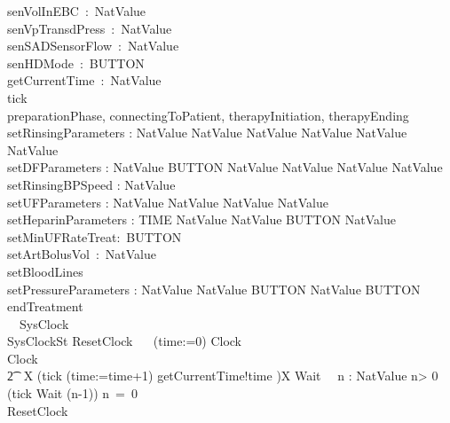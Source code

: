 \begin{circus}
  \circchannel senVolInEBC~:~NatValue\\
  \circchannel senVpTransdPress~:~NatValue\\
  \circchannel senSADSensorFlow~:~NatValue\\
  \circchannel senHDMode~:~BUTTON\\
  \circchannel getCurrentTime~:~NatValue\\
  \circchannel tick\\
  \circchannel preparationPhase, connectingToPatient, therapyInitiation, therapyEnding\\
  \circchannel setRinsingParameters : NatValue \cross NatValue \cross NatValue \cross NatValue \cross NatValue \cross NatValue\\
  \circchannel setDFParameters : NatValue \cross BUTTON \cross NatValue \cross NatValue \cross NatValue \cross NatValue\\
  \circchannel setRinsingBPSpeed : NatValue\\
  \circchannel setUFParameters : NatValue \cross NatValue \cross NatValue \cross NatValue\\
  \circchannel setHeparinParameters : TIME \cross NatValue \cross NatValue \cross BUTTON \cross NatValue\\
  \circchannel setMinUFRateTreat:~BUTTON\\
  \circchannel setArtBolusVol~:~NatValue\\
  \circchannel setBloodLines\\
  \circchannel setPressureParameters : NatValue \cross NatValue \cross BUTTON \cross NatValue \cross BUTTON\\
  \circchannel endTreatment\\
\circprocess\ ~SysClock ~\circdef~\circbegin\\
\circstate SysClockSt 
  ResetClock ~\circdef~ (time:=0) \circseq Clock\\
  Clock ~\circdef~
  \\\t2 \circmu~X \circspot  (tick \then (time:=time+1) \interleave getCurrentTime!time \then \Skip)\circseq X
  Wait~\circdef~ \circvar n : NatValue \circspot
   \circif n> 0 \circthen (tick \then Wait (n-1))
   \circelse n~=~0 \circthen \Skip
   \circfi\\
  \circspot ResetClock
  \circend
\end{circus}
